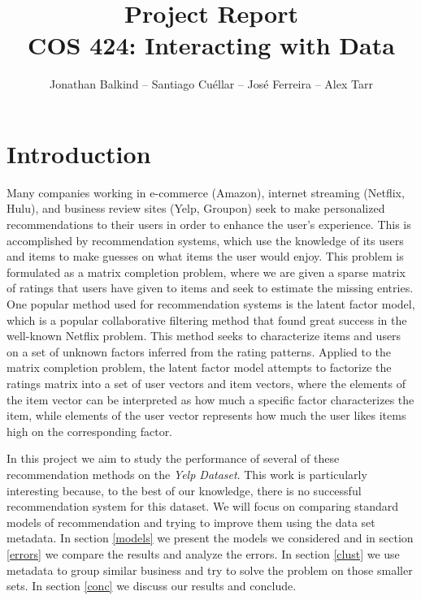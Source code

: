 \documentclass[12pt]{article}
\begin{document}

\title{\vspace{-2cm}Project Report \\  \large{COS 424: Interacting with Data}}
\author{Jonathan Balkind -- Santiago Cu\'ellar -- Jos\'e Ferreira -- Alex Tarr} 
\maketitle
\vspace{-1.5cm}


\section{Introduction} 
Many companies working in e-commerce (Amazon), internet streaming (Netflix, Hulu), and business review sites (Yelp, Groupon) seek 
to make personalized recommendations to their users in order to enhance the user's experience. This is accomplished by recommendation systems, 
which use the knowledge of its users and items to make guesses on what items the user would enjoy. This problem is formulated as a matrix completion 
problem, where we are given a sparse matrix of ratings that users have given to items and seek to estimate the missing entries.
	One popular method used for recommendation systems is the latent factor model, which is a popular collaborative filtering method that found great 
	success in the well-known Netflix problem. This method seeks to characterize items and users on a set of unknown factors inferred from the rating patterns. 
	Applied to the matrix completion problem, the latent factor model attempts to factorize the ratings matrix into a set 
	of user vectors and item vectors, where the elements of the item vector can be interpreted as how much a specific factor characterizes the item, while elements 
	of the user vector represents how much the user likes items high on the corresponding factor. 

In this project we aim to study the performance of several of these recommendation methods on the \emph{Yelp Dataset}. This work is particularly interesting because, to the best of our knowledge, there is no successful recommendation system for this dataset. We will focus on comparing standard models of recommendation and trying to improve them using the data set metadata. In section \ref{models} we present the models we considered and in section \ref{errors} we compare the results and analyze the errors. In section \ref{clust} we use metadata to group similar business and try to solve the problem on those smaller sets. In section \ref{conc} we discuss our results and conclude.
\end{document}
